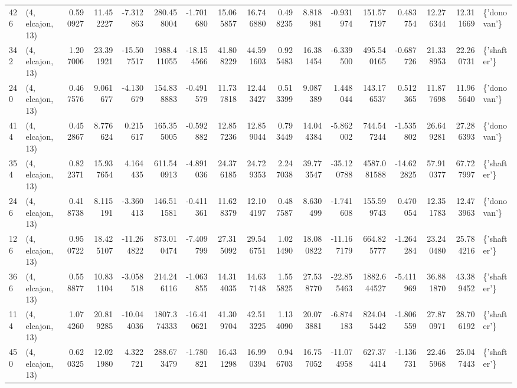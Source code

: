 \begin{tabular}{llrrrrrrrrrrrrrrl}
426 &  (4, elcajon, 13) &   0.590927 &  11.452227 &  -7.312863 &   280.458004 &  -1.701680 &  15.065857 &  16.746880 &  0.498235 &   8.818981 &  -0.931974 &   151.577197 &   0.483754 &  12.276344 &  12.311669 &  \{'donovan'\} \\
342 &  (4, elcajon, 13) &   1.207006 &  23.391921 & -15.507517 &  1988.411055 & -18.154566 &  41.808229 &  44.591603 &  0.925483 &  16.381454 &  -6.339500 &   495.540165 &  -0.687726 &  21.338953 &  22.260731 &  \{'shafter'\} \\
240 &  (4, elcajon, 13) &   0.467576 &   9.061677 &  -4.130679 &   154.838883 &  -0.491579 &  11.737818 &  12.443427 &  0.513399 &   9.087389 &   1.448044 &   143.176537 &   0.512365 &  11.877698 &  11.965640 &  \{'donovan'\} \\
414 &  (4, elcajon, 13) &   0.452867 &   8.776624 &   0.215617 &   165.355005 &  -0.592882 &  12.857236 &  12.859044 &  0.793449 &  14.044384 &  -5.862002 &   744.547244 &  -1.535802 &  26.649281 &  27.286393 &  \{'donovan'\} \\
354 &  (4, elcajon, 13) &   0.822371 &  15.937654 &   4.164435 &   611.540913 &  -4.891036 &  24.376185 &  24.729353 &  2.247038 &  39.773547 & -35.120788 &  4587.081588 & -14.622825 &  57.910377 &  67.727997 &  \{'shafter'\} \\
246 &  (4, elcajon, 13) &   0.418738 &   8.115191 &  -3.360413 &   146.511581 &  -0.411361 &  11.628379 &  12.104197 &  0.487587 &   8.630499 &  -1.741608 &   155.599743 &   0.470054 &  12.351783 &  12.473963 &  \{'donovan'\} \\
126 &  (4, elcajon, 13) &   0.950722 &  18.425107 & -11.264822 &   873.010474 &  -7.409799 &  27.315092 &  29.546751 &  1.021490 &  18.080822 & -11.167179 &   664.825777 &  -1.264284 &  23.240480 &  25.784216 &  \{'shafter'\} \\
366 &  (4, elcajon, 13) &   0.558877 &  10.831104 &  -3.058518 &   214.246116 &  -1.063855 &  14.314035 &  14.637148 &  1.555825 &  27.538770 & -22.855463 &  1882.644527 &  -5.411969 &  36.881870 &  43.389452 &  \{'shafter'\} \\
114 &  (4, elcajon, 13) &   1.074260 &  20.819285 & -10.044036 &  1807.374333 & -16.410621 &  41.309704 &  42.513225 &  1.134090 &  20.073881 &  -6.874183 &   824.045442 &  -1.806559 &  27.870971 &  28.706192 &  \{'shafter'\} \\
450 &  (4, elcajon, 13) &   0.620325 &  12.021980 &   4.322721 &   288.673479 &  -1.780821 &  16.431298 &  16.990394 &  0.946703 &  16.757052 & -11.074958 &   627.374414 &  -1.136731 &  22.465968 &  25.047443 &  \{'shafter'\} \\

\end{tabular}
